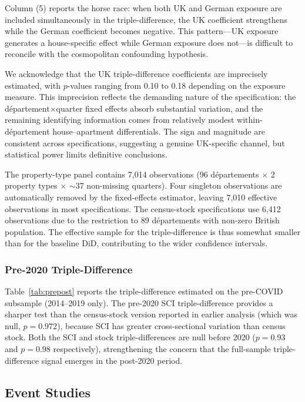 \documentclass[12pt]{article}
\begin{document}
Column (5) reports the horse race: when both UK and German exposure are included simultaneously in the triple-difference, the UK coefficient strengthens while the German coefficient becomes negative. This pattern---UK exposure generates a house-specific effect while German exposure does not---is difficult to reconcile with the cosmopolitan confounding hypothesis.

We acknowledge that the UK triple-difference coefficients are imprecisely estimated, with $p$-values ranging from 0.10 to 0.18 depending on the exposure measure. This imprecision reflects the demanding nature of the specification: the d\'epartement$\times$quarter fixed effects absorb substantial variation, and the remaining identifying information comes from relatively modest within-d\'epartement house--apartment differentials. The sign and magnitude are consistent across specifications, suggesting a genuine UK-specific channel, but statistical power limits definitive conclusions.

The property-type panel contains 7,014 observations (96 d\'epartements $\times$ 2 property types $\times$ $\sim$37 non-missing quarters). Four singleton observations are automatically removed by the fixed-effects estimator, leaving 7,010 effective observations in most specifications. The census-stock specifications use 6,412 observations due to the restriction to 89 d\'epartements with non-zero British population. The effective sample for the triple-difference is thus somewhat smaller than for the baseline DiD, contributing to the wider confidence intervals.

\subsubsection{Pre-2020 Triple-Difference}

Table~\ref{tab:prepost} reports the triple-difference estimated on the pre-COVID subsample (2014--2019 only). The pre-2020 SCI triple-difference provides a sharper test than the census-stock version reported in earlier analysis (which was null, $p = 0.972$), because SCI has greater cross-sectional variation than census stock. Both the SCI and stock triple-differences are null before 2020 ($p = 0.93$ and $p = 0.98$ respectively), strengthening the concern that the full-sample triple-difference signal emerges in the post-2020 period.

{\footnotesize}

\subsection{Event Studies}
\end{document}
